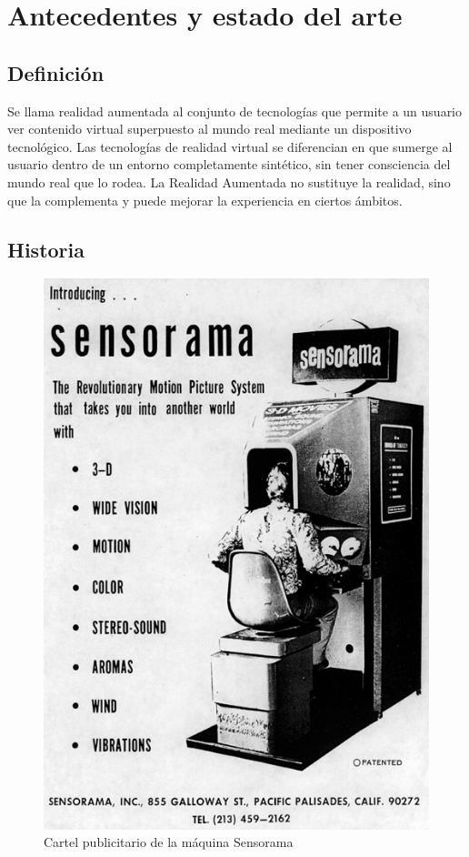 \chapter{Antecedentes y estado del arte}
\section{Definición}
Se llama realidad aumentada al conjunto de tecnologías que permite a un usuario ver contenido virtual superpuesto al mundo real mediante un dispositivo tecnológico. Las tecnologías de realidad virtual se diferencian en que sumerge al usuario dentro de un entorno completamente sintético, sin tener consciencia del mundo real que lo rodea. La Realidad Aumentada no sustituye la realidad, sino que la complementa y puede mejorar la experiencia en ciertos ámbitos.

\section{Historia}
\begin{figure}
    \centering
    \includegraphics{Images/Sensorama.png}
    \caption{Cartel publicitario de la máquina Sensorama}
    \label{fig:Sensorama}
\end{figure}

